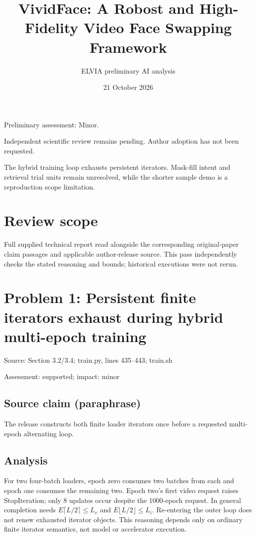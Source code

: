 \documentclass[11pt]{article}
\begin{document}
\title{VividFace: A Robost and High-Fidelity Video Face Swapping Framework}

\author{ELVIA preliminary AI analysis}\date{21 October 2026}\maketitle

Preliminary assessment: Minor.\par

Independent scientific review remains pending. Author adoption has not been requested.

The hybrid training loop exhausts persistent iterators. Mask-fill intent and retrieval trial units remain unresolved, while the shorter sample demo is a reproduction scope limitation.

\section*{Review scope}

Full supplied technical report read alongside the corresponding original-paper claim passages and applicable author-release source. This pass independently checks the stated reasoning and bounds; historical executions were not rerun.

\section*{Problem 1: Persistent finite iterators exhaust during hybrid multi-epoch training}

Source: Section 3.2/3.4; train.py, lines 435–443; train.sh

Assessment: supported; impact: minor

\subsection*{Source claim (paraphrase)}

The release constructs both finite loader iterators once before a requested multi-epoch alternating loop.

\subsection*{Analysis}

For two four-batch loaders, epoch zero consumes two batches from each and epoch one consumes the remaining two. Epoch two’s first video request raises StopIteration; only \(8\) updates occur despite the \(1000\)-epoch request. In general completion needs \(E\lceil L/2\rceil\le L_v\) and \(E\lfloor L/2\rfloor\le L_i\). Re-entering the outer loop does not renew exhausted iterator objects. This reasoning depends only on ordinary finite iterator semantics, not model or accelerator execution.
\end{document}
